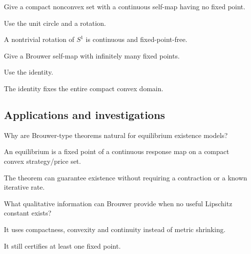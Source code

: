 \begin{exercise}\label{exr:ii17-expand-11}
Give a compact nonconvex set with a continuous self-map having no fixed point.
\end{exercise}
\begin{hint}
Use the unit circle and a rotation.
\end{hint}
\begin{solution}
A nontrivial rotation of \(S^1\) is continuous and fixed-point-free.
\end{solution}

\begin{exercise}\label{exr:ii17-expand-12}
Give a Brouwer self-map with infinitely many fixed points.
\end{exercise}
\begin{hint}
Use the identity.
\end{hint}
\begin{solution}
The identity fixes the entire compact convex domain.
\end{solution}

\subsection*{Applications and investigations}

\begin{exercise}\label{exr:ii17-expand-13}
Why are Brouwer-type theorems natural for equilibrium existence models?
\end{exercise}
\begin{hint}
An equilibrium is a fixed point of a continuous response map on a compact convex strategy/price set.
\end{hint}
\begin{solution}
The theorem can guarantee existence without requiring a contraction or a known iterative rate.
\end{solution}

\begin{exercise}\label{exr:ii17-expand-14}
What qualitative information can Brouwer provide when no useful Lipschitz constant exists?
\end{exercise}
\begin{hint}
It uses compactness, convexity and continuity instead of metric shrinking.
\end{hint}
\begin{solution}
It still certifies at least one fixed point.
\end{solution}

